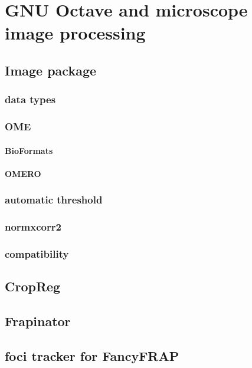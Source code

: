 \chapter{GNU Octave and microscope image processing}
\label{ch:octave}


\section{Image package}
  \subsection{data types}

  \subsection{OME}

    \subsubsection{BioFormats}
    \subsubsection{OMERO}
  \subsection{automatic threshold}
  \subsection{normxcorr2}


  \subsection{compatibility}

\section{CropReg}
\section{Frapinator}
\section{foci tracker for FancyFRAP}

